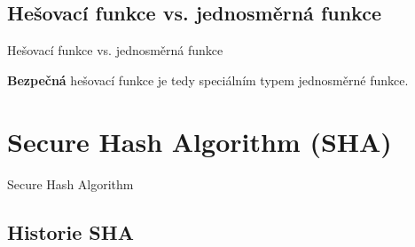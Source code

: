 \documentclass[11pt,professionalfont,aspectratio=43]{beamer}
\begin{document}
\subsection{Hešovací funkce vs. jednosměrná funkce}

\begin{frame}{Hešovací funkce vs. jednosměrná funkce}


\begin{tnoticeframe*}
    \begin{center}
        \textbf{Bezpečná} hešovací funkce je tedy speciálním typem jednosměrné funkce.
    \end{center}
\end{tnoticeframe*}

\end{frame}

\section{Secure Hash Algorithm (SHA)}

\begin{titleframeenv}{Secure Hash Algorithm}
\end{titleframeenv}

\subsection{Historie SHA}
\end{document}
